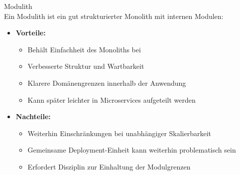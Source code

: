 \begin{concept}{Modulith}\\
    Ein Modulith ist ein gut strukturierter Monolith mit internen Modulen:
    \begin{itemize}
        \item \textbf{Vorteile:}
        \begin{itemize}
            \item Behält Einfachheit des Monoliths bei
            \item Verbesserte Struktur und Wartbarkeit
            \item Klarere Domänengrenzen innerhalb der Anwendung
            \item Kann später leichter in Microservices aufgeteilt werden
        \end{itemize}
        
        \item \textbf{Nachteile:}
        \begin{itemize}
            \item Weiterhin Einschränkungen bei unabhängiger Skalierbarkeit
            \item Gemeinsame Deployment-Einheit kann weiterhin problematisch sein
            \item Erfordert Disziplin zur Einhaltung der Modulgrenzen
        \end{itemize}
    \end{itemize}
\end{concept}

